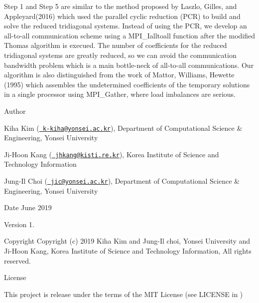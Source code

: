 Step 1 and Step 5 are similar to the method proposed by Laszlo, Gilles, and Appleyard(2016) which used the parallel cyclic reduction (P\+CR) to build and solve the reduced tridiagonal systems. Instead of using the P\+CR, we develop an all-\/to-\/all communication scheme using a M\+P\+I\+\_\+\+Ialltoall function after the modified Thomas algorithm is execued. The number of coefficients for the reduced tridiagonal systems are greatly reduced, so we can avoid the communication bandwidth problem which is a main bottle-\/neck of all-\/to-\/all communications. Our algorithm is also distinguished from the work of Mattor, Williams, Hewette (1995) which assembles the undetermined coefficients of the temporary solutions in a single processor using M\+P\+I\+\_\+\+Gather, where load imbalances are serious.

\begin{DoxyAuthor}{Author}

\end{DoxyAuthor}

\begin{DoxyItemize}
\item Kiha Kim (\href{mailto:k-kiha@yonsei.ac.kr}{\texttt{ k-\/kiha@yonsei.\+ac.\+kr}}), Department of Computational Science \& Engineering, Yonsei University
\item Ji-\/\+Hoon Kang (\href{mailto:jhkang@kisti.re.kr}{\texttt{ jhkang@kisti.\+re.\+kr}}), Korea Institute of Science and Technology Information
\item Jung-\/\+Il Choi (\href{mailto:jic@yonsei.ac.kr}{\texttt{ jic@yonsei.\+ac.\+kr}}), Department of Computational Science \& Engineering, Yonsei University
\end{DoxyItemize}

\begin{DoxyDate}{Date}
June 2019 
\end{DoxyDate}
\begin{DoxyVersion}{Version}
1. 
\end{DoxyVersion}
\begin{DoxyParagraph}{Copyright}
Copyright (c) 2019 Kiha Kim and Jung-\/\+Il choi, Yonsei University and Ji-\/\+Hoon Kang, Korea Institute of Science and Technology Information, All rights reserved. 
\end{DoxyParagraph}
\begin{DoxyParagraph}{License }

\end{DoxyParagraph}
This project is release under the terms of the M\+IT License (see L\+I\+C\+E\+N\+SE in ) 